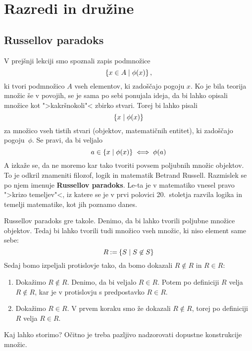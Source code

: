 \chapter{Razredi in družine}
\label{cha:razred-druzine}

\section{Russellov paradoks}

V prejšnji lekciji smo spoznali zapis podmnožice
%
\begin{equation*}
    \left\{ x \in A \; \middle| \; \phi(x) \right\},
\end{equation*}
%
ki tvori podmnožico $A$ vseh elementov, ki zadoščajo pogoju $x$. Ko je bila
teorija množic še v povojih, se je sama po sebi ponujala ideja, da bi lahko
opisali množice kot ">kakršnokoli"< zbirko stvari. Torej bi lahko pisali
%
\begin{equation*}
    \left\{ x \; \middle| \; \phi(x) \right\}
\end{equation*}
%
za množico vseh tistih stvari (objektov, matematičnih entitet), ki zadoščajo
pogoju~$\phi$. Se pravi, da bi veljalo
%
\begin{equation*}
    a \in \left\{ x \; \middle| \; \phi(x) \right\} \iff \phi(a)
\end{equation*}
%
A izkaže se, da ne moremo kar tako tvoriti povsem poljubnih množic objektov. To
je odkril znameniti filozof, logik in matematik Betrand Russell. Razmislek se po
njem imenuje \textbf{Russellov paradoks}. Le-ta je v matematiko vnesel pravo ">krizo
temeljev"<, iz katere se je v prvi polovici 20.~stoletja razvila logika in
temelji matematike, kot jih poznamo danes.

Russellov paradoks gre takole. Denimo, da bi lahko tvorili poljubne množice
objektov. Tedaj bi lahko tvorili tudi množico vseh množic, ki niso element same
sebe:
%
\begin{equation*}
    R \mathbin{{:}{=}} \left\{ S \; \middle| \; S \not\in S \right\}
\end{equation*}
%
Sedaj bomo izpeljali protislovje tako, da bomo dokazali $R \not\in R$ in $R \in R$:
%
\begin{enumerate}
\item Dokažimo $R \not\in R$.
  Denimo, da bi veljalo $R \in R$. Potem po definiciji $R$ velja $R \not\in R$, kar
  je v protislovju s predpostavko $R \in R$.

\item
  Dokažimo $R \in R$. V prvem koraku smo že dokazali $R \not\in R$, torej po
  definiciji $R$ velja $R \in R$.
\end{enumerate}
%
Kaj lahko storimo? Očitno je treba pazljivo nadzorovati dopustne konstrukcije
množic.

